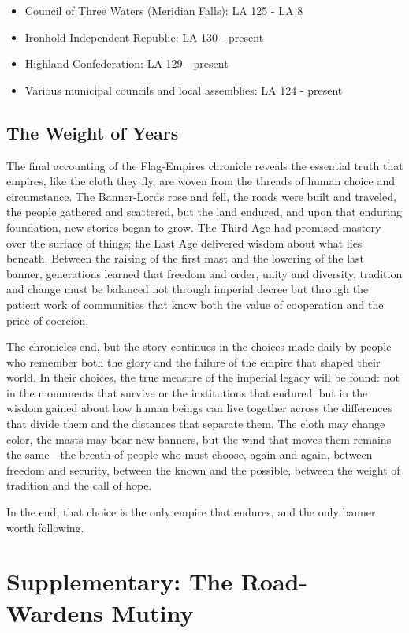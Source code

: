 \begin{itemize}
\tightlist
\item
  Council of Three Waters (Meridian Falls): LA 125 - LA 8
\item
  Ironhold Independent Republic: LA 130 - present
\item
  Highland Confederation: LA 129 - present
\item
  Various municipal councils and local assemblies: LA 124 - present
\end{itemize}

\subsection{The Weight of Years}\label{the-weight-of-years}

The final accounting of the Flag-Empires chronicle reveals the essential
truth that empires, like the cloth they fly, are woven from the threads
of human choice and circumstance. The Banner-Lords rose and fell, the
roads were built and traveled, the people gathered and scattered, but
the land endured, and upon that enduring foundation, new stories began
to grow. The Third Age had promised mastery over the surface of things;
the Last Age delivered wisdom about what lies beneath. Between the
raising of the first mast and the lowering of the last banner,
generations learned that freedom and order, unity and diversity,
tradition and change must be balanced not through imperial decree but
through the patient work of communities that know both the value of
cooperation and the price of coercion.

The chronicles end, but the story continues in the choices made daily by
people who remember both the glory and the failure of the empire that
shaped their world. In their choices, the true measure of the imperial
legacy will be found: not in the monuments that survive or the
institutions that endured, but in the wisdom gained about how human
beings can live together across the differences that divide them and the
distances that separate them. The cloth may change color, the masts may
bear new banners, but the wind that moves them remains the same---the
breath of people who must choose, again and again, between freedom and
security, between the known and the possible, between the weight of
tradition and the call of hope.

In the end, that choice is the only empire that endures, and the only
banner worth following.

\section{Supplementary: The Road-Warden\textquotesingle s
Mutiny}\label{supplementary-the-road-wardens-mutiny}

